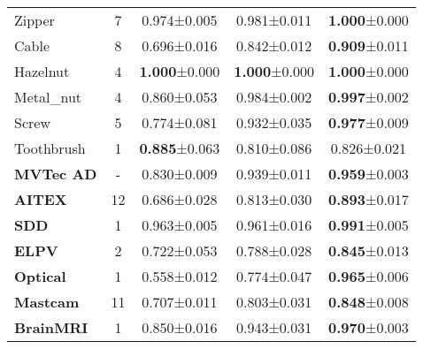 \documentclass[10pt,twocolumn,letterpaper]{article}
\begin{document}
{\begin{table}[bt]
{\begin{tabular}{l@{}|c|ccc}
    Zipper & 7 & 0.974\footnotesize{±0.005}& 0.981\footnotesize{±0.011}& \textbf{1.000}\footnotesize{±0.000} \\
    
    Cable &8 & 0.696\footnotesize{±0.016}& 0.842\footnotesize{±0.012}& \textbf{0.909}\footnotesize{±0.011} \\
    
    Hazelnut &4 & \textbf{1.000}\footnotesize{±0.000}& \textbf{1.000}\footnotesize{±0.000}& \textbf{1.000}\footnotesize{±0.000} \\
    
    Metal\_nut & 4 & 0.860\footnotesize{±0.053}& 0.984\footnotesize{±0.002}& \textbf{0.997}\footnotesize{±0.002} \\
    
    Screw & 5 & 0.774\footnotesize{±0.081}& 0.932\footnotesize{±0.035}& \textbf{0.977}\footnotesize{±0.009} \\
    
    Toothbrush & 1 & \textbf{0.885}\footnotesize{±0.063}& 0.810\footnotesize{±0.086}& 0.826\footnotesize{±0.021} \\
    
    \hline
    \textbf{MVTec AD} & - & 0.830\footnotesize{±0.009}& 0.939\footnotesize{±0.011}& \textbf{0.959}\footnotesize{±0.003} \\
    
    \textbf{AITEX } &12 & 0.686\footnotesize{±0.028}& 0.813\footnotesize{±0.030}& \textbf{0.893}\footnotesize{±0.017} \\
    
    \textbf{SDD}& 1 & 0.963\footnotesize{±0.005}& 0.961\footnotesize{±0.016}& \textbf{0.991}\footnotesize{±0.005} \\
    
    \textbf{ELPV} & 2 & 0.722\footnotesize{±0.053}& 0.788\footnotesize{±0.028}& \textbf{0.845}\footnotesize{±0.013} \\
    
   \textbf{Optical}& 1 & 0.558\footnotesize{±0.012}& 0.774\footnotesize{±0.047}& \textbf{0.965}\footnotesize{±0.006}\\
   
   \textbf{Mastcam}& 11 & 0.707\footnotesize{±0.011}& 0.803\footnotesize{±0.031}& \textbf{0.848}\footnotesize{±0.008}\\
   
    \textbf{BrainMRI}& 1 & 0.850\footnotesize{±0.016}& 0.943\footnotesize{±0.031}& \textbf{0.970}\footnotesize{±0.003}\\
    

\end{tabular}}
\end{table}}
\end{document}
